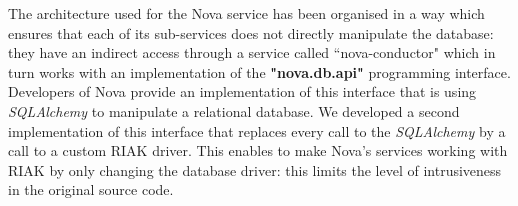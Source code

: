 The architecture used for the Nova service has been organised in a way which
ensures that each of its sub-services does not directly manipulate the database:
they have an indirect access through a service called ``nova-conductor" which in
turn works with an implementation of the \textbf{"nova.db.api"} programming
interface. Developers of Nova provide an implementation of this interface that
is using \textit{SQLAlchemy} to manipulate a relational database. We developed a
second implementation of this interface that replaces every call to the
\textit{SQLAlchemy} by a call to a custom RIAK driver. This enables to make
Nova's services working with RIAK by only changing the database driver: this
limits the level of intrusiveness in the original source code.
